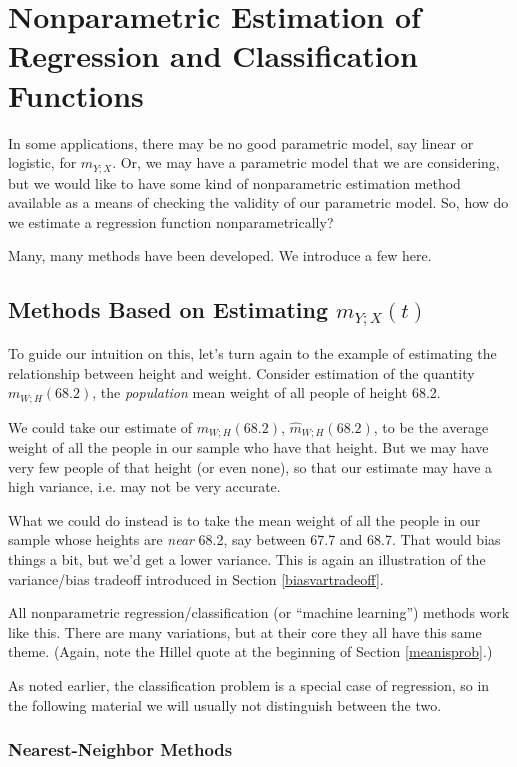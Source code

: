 \chapter{Nonparametric Estimation of Regression and Classification Functions}
\label{chap:nonparregclass}

In some applications, there may be no good parametric model, say linear
or logistic, for $m_{Y;X}$.  Or, we may have a parametric model that we
are considering, but we would like to have some kind of nonparametric
estimation method available as a means of checking the validity of our
parametric model.  So, how do we estimate a regression function
nonparametrically?

Many, many methods have been developed.  We introduce a few here.

\section{Methods Based on Estimating $m_{Y;X}(t)$}

To guide our intuition on this, let's turn again to the example of
estimating the relationship between height and weight.  Consider
estimation of the quantity $m_{W;H}(68.2)$, the {\it population} mean
weight of all people of height 68.2.  

We could take our estimate of $m_{W;H}(68.2)$,
$\widehat{m}_{W;H}(68.2)$,  to be the average weight of all the people
in our sample who have that height.  But we may have very few people of
that height (or even none), so that our estimate may have a high
variance, i.e. may not be very accurate.

What we could do instead is to take the mean weight of all the people in
our sample whose heights are {\it near} 68.2, say between 67.7 and 68.7.
That would bias things a bit, but we'd get a lower variance.  This is
again an illustration of the variance/bias tradeoff introduced in
Section \ref{biasvartradeoff}.

All nonparametric regression/classification (or ``machine learning'')
methods work like this.  There are many variations, but at their core
they all have this same theme.  (Again, note the Hillel quote at the
beginning of Section \ref{meanisprob}.)

As noted earlier, the classification problem is a special case of
regression, so in the following material we will usually not distinguish
between the two.

\subsection{Nearest-Neighbor Methods}


